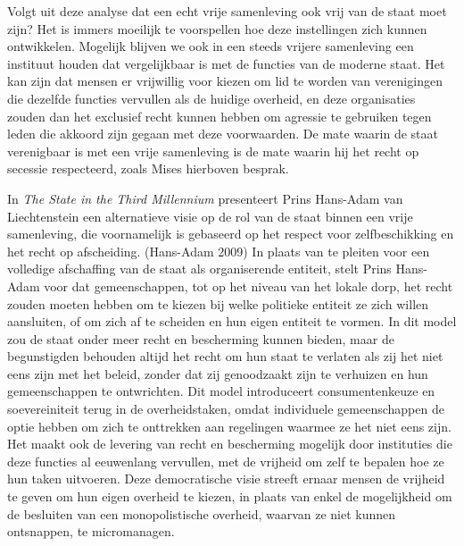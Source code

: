\documentclass[
  a5paper,
  smalldemyvopaper,11pt,twoside,onecolumn,openright,extrafontsizes,
hidelinks]{memoir}
\begin{document}
Volgt uit deze analyse dat een echt vrije samenleving ook vrij van de
staat moet zijn? Het is immers moeilijk te voorspellen hoe deze
instellingen zich kunnen ontwikkelen. Mogelijk blijven we ook in een
steeds vrijere samenleving een instituut houden dat vergelijkbaar is met
de functies van de moderne staat. Het kan zijn dat mensen er vrijwillig
voor kiezen om lid te worden van verenigingen die dezelfde functies
vervullen als de huidige overheid, en deze organisaties zouden dan het
exclusief recht kunnen hebben om agressie te gebruiken tegen leden die
akkoord zijn gegaan met deze voorwaarden. De mate waarin de staat
verenigbaar is met een vrije samenleving is de mate waarin hij het recht
op secessie respecteerd, zoals Mises hierboven besprak.

In \emph{The State in the Third Millennium} presenteert Prins Hans-Adam
van Liechtenstein een alternatieve visie op de rol van de staat binnen
een vrije samenleving, die voornamelijk is gebaseerd op het respect voor
zelfbeschikking en het recht op afscheiding. (Hans-Adam 2009) In plaats
van te pleiten voor een volledige afschaffing van de staat als
organiserende entiteit, stelt Prins Hans-Adam voor dat gemeenschappen,
tot op het niveau van het lokale dorp, het recht zouden moeten hebben om
te kiezen bij welke politieke entiteit ze zich willen aansluiten, of om
zich af te scheiden en hun eigen entiteit te vormen. In dit model zou de
staat onder meer recht en bescherming kunnen bieden, maar de
begunstigden behouden altijd het recht om hun staat te verlaten als zij
het niet eens zijn met het beleid, zonder dat zij genoodzaakt zijn te
verhuizen en hun gemeenschappen te ontwrichten. Dit model introduceert
consumentenkeuze en soevereiniteit terug in de overheidstaken, omdat
individuele gemeenschappen de optie hebben om zich te onttrekken aan
regelingen waarmee ze het niet eens zijn. Het maakt ook de levering van
recht en bescherming mogelijk door instituties die deze functies al
eeuwenlang vervullen, met de vrijheid om zelf te bepalen hoe ze hun
taken uitvoeren. Deze democratische visie streeft ernaar mensen de
vrijheid te geven om hun eigen overheid te kiezen, in plaats van enkel
de mogelijkheid om de besluiten van een monopolistische overheid,
waarvan ze niet kunnen ontsnappen, te micromanagen.
\end{document}
